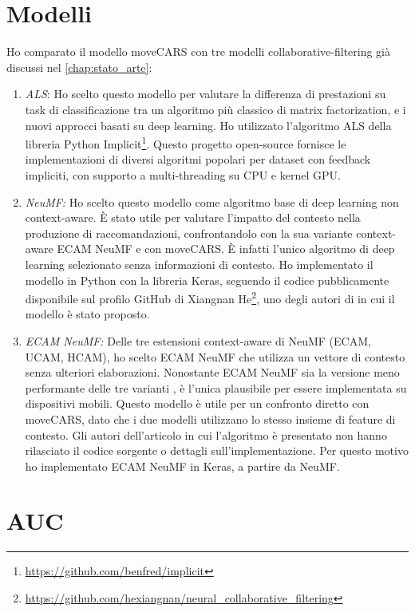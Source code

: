 \documentclass[12pt,italian]{report}
\begin{document}
\section{Modelli} \label{sec:comp-model}
Ho comparato il modello moveCARS con tre modelli collaborative-filtering già discussi nel \autoref{chap:stato_arte}:
\begin{enumerate}
\item \textit{ALS}: Ho scelto questo modello per valutare la differenza di prestazioni su task di classificazione tra un algoritmo più classico di matrix factorization,
e i nuovi approcci basati su deep learning. Ho utilizzato l'algoritmo ALS della libreria Python Implicit\footnote{\url{https://github.com/benfred/implicit}}. Questo progetto open-source fornisce le implementazioni di diversi algoritmi popolari per dataset con feedback impliciti, con supporto a multi-threading su CPU e kernel GPU. 

\item \textit{NeuMF:} Ho scelto questo modello come algoritmo base di deep learning non context-aware. \`E stato utile 
per valutare l'impatto del contesto nella produzione di raccomandazioni, confrontandolo con la sua variante context-aware ECAM NeuMF e con moveCARS. \`E infatti l'unico algoritmo di deep learning selezionato senza informazioni di contesto. Ho implementato il modello in Python con la libreria Keras, seguendo il codice pubblicamente disponibile sul profilo GitHub di Xiangnan He\footnote{\url{https://github.com/hexiangnan/neural_collaborative_filtering}}, uno degli autori di \cite{NCF} in cui il modello è stato proposto.

\item \textit{ECAM NeuMF:} Delle tre estensioni context-aware di NeuMF (ECAM, UCAM, HCAM), ho scelto ECAM NeuMF che utilizza un vettore di contesto senza ulteriori elaborazioni. Nonostante ECAM NeuMF sia la versione meno performante delle tre varianti \cite{context-aware-deep-learning}, è l'unica plausibile per essere implementata su dispositivi mobili. Questo modello è utile per un confronto diretto con moveCARS, dato che i due modelli utilizzano lo stesso insieme di feature di contesto. Gli autori dell'articolo in cui l'algoritmo è presentato non hanno rilasciato il codice sorgente o dettagli sull'implementazione. Per questo motivo ho implementato ECAM NeuMF in Keras, a partire da NeuMF.
\end{enumerate}

\section{AUC} \label{sec:auc}
\end{document}
